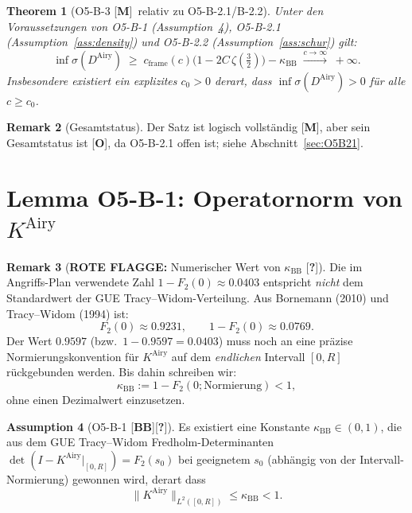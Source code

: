 \documentclass[12pt,a4paper]{amsart}
\newcommand{\statusM}{{\color{green!60!black}[\textbf{M}]}}
\newcommand{\statusO}{{\color{red}[\textbf{O}]}}
\newcommand{\statusBB}{{\color{blue}[\textbf{BB}]}}
\newcommand{\statusQ}{{\color{red}[\textbf{?}]}}
\newcommand{\roteFlagge}[1]{{\color{red}\textbf{ROTE FLAGGE: }#1}}
\newtheorem{theorem}{Theorem}[section]
\theoremstyle{definition}
\newtheorem{assumption}[theorem]{Assumption}
\newtheorem{remark}[theorem]{Remark}
\newcommand{\KAiry}{K^{\mathrm{Airy}}}
\newcommand{\DAiry}{D^{\mathrm{Airy}}}
\newcommand{\FTW}{F_2}
\newcommand{\kappaBB}{\kappa_{\mathrm{BB}}}
\newcommand{\cframe}{c_{\mathrm{frame}}}
\newcommand{\norm}[1]{\lVert #1 \rVert}
\begin{document}
\begin{theorem}[O5-B-3 \statusM\ relativ zu O5-B-2.1/B-2.2]
\label{thm:O5B3}
Unter den Voraussetzungen von O5-B-1 (Assumption~\ref{ass:kappaBB}),
O5-B-2.1 (Assumption~\ref{ass:density}) und O5-B-2.2
(Assumption~\ref{ass:schur}) gilt:
\[
  \inf\sigma(\DAiry)
  \;\ge\;
  \cframe(c)\bigl(1 - 2C\,\zeta\!\left(\tfrac{3}{2}\right)\bigr)
  - \kappaBB
  \;\xrightarrow{c\to\infty}\; +\infty.
\]
Insbesondere existiert ein explizites $c_0 > 0$ derart, dass
$\inf\sigma(\DAiry) > 0$ für alle $c \ge c_0$.
\end{theorem}

\begin{remark}[Gesamtstatus]
Der Satz ist logisch vollständig \statusM, aber sein Gesamtstatus
ist \statusO, da O5-B-2.1 offen ist; siehe Abschnitt~\ref{sec:O5B21}.
\end{remark}

\section{Lemma O5-B-1: Operatornorm von $\KAiry$}
\label{sec:O5B1}

\begin{remark}[\roteFlagge{Numerischer Wert von $\kappaBB$} \statusQ]
\label{rem:kappaBB_rot}
Die im Angriffs-Plan verwendete Zahl $1 - \FTW(0) \approx 0.0403$
entspricht \emph{nicht} dem Standardwert der GUE Tracy--Widom-Verteilung.
Aus Bornemann (2010) und Tracy--Widom (1994) ist:
\[
  F_2(0) \approx 0.9231, \qquad 1 - F_2(0) \approx 0.0769.
\]
Der Wert $0.9597$ (bzw.\ $1-0.9597 = 0.0403$) muss noch an eine
präzise Normierungskonvention für $\KAiry$ auf dem \emph{endlichen}
Intervall $[0,R]$ rückgebunden werden.
Bis dahin schreiben wir:
\[
  \kappaBB := 1 - \FTW(0;\text{Normierung}) < 1,
\]
ohne einen Dezimalwert einzusetzen.
\end{remark}

\begin{assumption}[O5-B-1 \statusBB\statusQ]
\label{ass:kappaBB}
Es existiert eine Konstante $\kappaBB \in (0,1)$, die aus dem
GUE Tracy--Widom Fredholm-Determinanten
$\det(I - \KAiry|_{[0,R]}) = \FTW(s_0)$
bei geeignetem $s_0$ (abhängig von der Intervall-Normierung) gewonnen wird,
derart dass
\[
  \norm{\KAiry}_{L^2([0,R])} \le \kappaBB < 1.
\]
\end{assumption}
\end{document}
